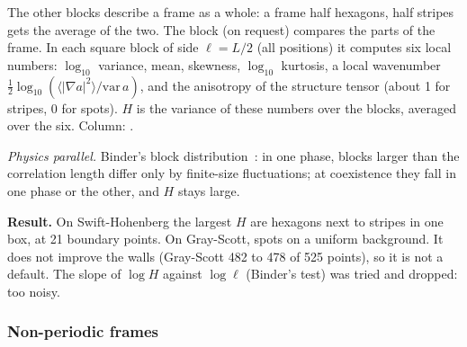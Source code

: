\documentclass[11pt,a4paper]{article}
\newcommand{\code}[1]{\texttt{\detokenize{#1}}}
\newcommand{\avg}[1]{\langle #1 \rangle}
\begin{document}
\begin{tech}
The other blocks describe a frame as a whole: a frame half hexagons, half stripes gets the average of the
two. The block \code{parts} (on request) compares the parts of the frame. In each square block of side
$\ell=L/2$ (all positions) it computes six local numbers: $\log_{10}$ variance, mean, skewness,
$\log_{10}$ kurtosis, a local wavenumber $\tfrac12\log_{10}(\avg{|\nabla a|^2}/\mathrm{var}\,a)$, and the
anisotropy of the structure tensor (about 1 for stripes, 0 for spots). $H$ is the variance of these numbers
over the blocks, averaged over the six. Column: \code{log10H}.

\emph{Physics parallel.} Binder's block distribution~\cite{binder1981}: in one phase, blocks larger than the
correlation length differ only by finite-size fluctuations; at coexistence they fall in one phase or the
other, and $H$ stays large.

\textbf{Result.} On Swift-Hohenberg the largest $H$ are hexagons next to stripes in one box, at 21 boundary
points. On Gray-Scott, spots on a uniform background. It does not improve the walls (Gray-Scott 482 to 478 of
525 points), so it is not a default. The slope of $\log H$ against $\log\ell$ (Binder's test) was tried and
dropped: too noisy.
\end{tech}

\subsubsection{Non-periodic frames}\label{sec:nonperiodic}
\end{document}
